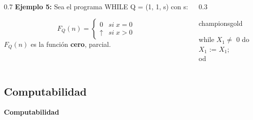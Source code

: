 \documentclass[xcolor=table]{beamer}
\begin{document}
\begin{frame}[fragile]
\begin{columns}
\end{columns}

\begin{columns}

    \begin{column}{0.7\textwidth}
       \textbf{Ejemplo 5:}
       \vspace{0.2cm}
         Sea el programa WHILE Q = (1, 1, s) con s:\\
\vspace{0.2cm}


        \[F_Q(n) = \left\{ \begin{array}{lr} 0 & si\; x = 0\\  \uparrow & si\; x > 0 \end{array} \right. \]
         $F_Q(n)$ es la función \textbf{cero}, parcial.

    \end{column}

    \begin{column}{0.3\textwidth}
        \begin{colorblock}[black]{championsgold}{}\scriptsize

        \hspace{0.5cm}while $X_1 \neq$ 0 do\\
        \hspace{0.75cm}    $X_1$ := $X_1$;\\
        \hspace{0.5cm}od
        \end{colorblock}
    \end{column}
    
\end{columns}
        
\end{frame}


\subsection{Computabilidad}
\begin{frame}  \Large

\begin{center}
    \textbf{Computabilidad }
\end{center}

\end{frame} 
\end{document}
